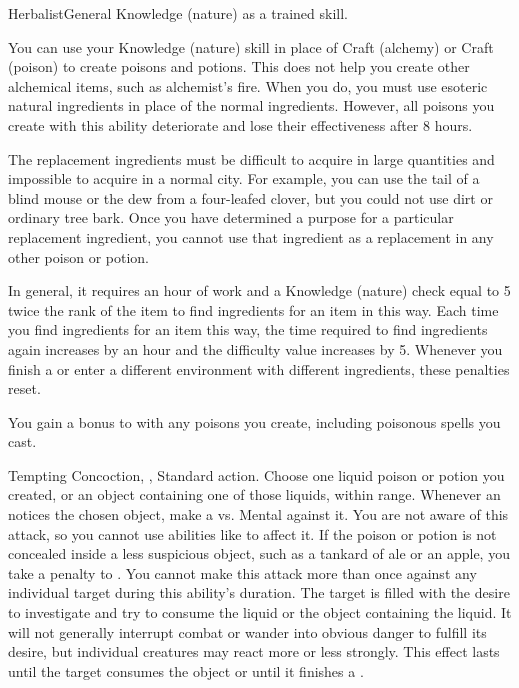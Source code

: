     \begin{feat}{Herbalist}{General}
        \featpre Knowledge (nature) as a trained skill.

         You can use your Knowledge (nature) skill in place of Craft (alchemy) or Craft (poison) to create poisons and potions.
        This does not help you create other alchemical items, such as alchemist's fire.
        When you do, you must use esoteric natural ingredients in place of the normal ingredients.
        However, all poisons you create with this ability deteriorate and lose their effectiveness after 8 hours.

        The replacement ingredients must be difficult to acquire in large quantities and impossible to acquire in a normal city.
        For example, you can use the tail of a blind mouse or the dew from a four-leafed clover, but you could not use dirt or ordinary tree bark.
        Once you have determined a purpose for a particular replacement ingredient, you cannot use that ingredient as a replacement in any other poison or potion.

        In general, it requires an hour of work and a Knowledge (nature) check equal to 5 \add twice the rank of the item to find ingredients for an item in this way.
        Each time you find ingredients for an item this way, the time required to find ingredients again increases by an hour and the difficulty value increases by 5.
        Whenever you finish a  or enter a different environment with different ingredients, these penalties reset.

         You gain a  bonus to  with any poisons you create, including poisonous spells you cast.

        \begin{magicalattuneability}{Tempting Concoction}{, , }
            \abilityusagetime Standard action.
            \rankline
            Choose one liquid poison or potion you created, or an object containing one of those liquids, within \rngshort range.
            Whenever an  notices the chosen object, make a  vs. Mental against it.
            You are not aware of this attack, so you cannot use abilities like  to affect it.
            If the poison or potion is not concealed inside a less suspicious object, such as a tankard of ale or an apple, you take a  penalty to .
            You cannot make this attack more than once against any individual target during this ability's duration.
            \hit The target is filled with the desire to investigate and try to consume the liquid or the object containing the liquid.
            It will not generally interrupt combat or wander into obvious danger to fulfill its desire, but individual creatures may react more or less strongly.
            This effect lasts until the target consumes the object or until it finishes a .


\end{magicalattuneability}
\end{feat}
